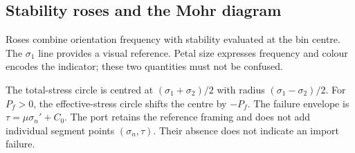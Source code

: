 \subsection{Stability roses and the Mohr diagram}
Roses combine orientation frequency with stability evaluated at the bin centre. The \(\sigma_1\) line provides a visual reference. Petal size expresses frequency and colour encodes the indicator; these two quantities must not be confused.

The total-stress circle is centred at \((\sigma_1+\sigma_2)/2\) with radius \((\sigma_1-\sigma_2)/2\). For \(P_f>0\), the effective-stress circle shifts the centre by \(-P_f\). The failure envelope is \(\tau=\mu\sigma_n'+C_0\). The port retains the reference framing and does not add individual segment points \((\sigma_n,\tau)\). Their absence does not indicate an import failure.
